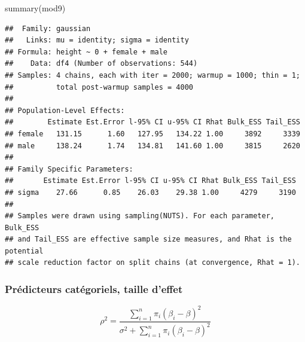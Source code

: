 \documentclass[
  a4paper,11pt,twoside,onecolumn,openright,final,oldfontcommands]{memoir}
\newenvironment{Shaded}{\begin{snugshade}}{\end{snugshade}}
\newcommand{\CommentTok}[1]{\textcolor[rgb]{0.56,0.35,0.01}{\textit{#1}}}
\newcommand{\DecValTok}[1]{\textcolor[rgb]{0.00,0.00,0.81}{#1}}
\newcommand{\FunctionTok}[1]{\textcolor[rgb]{0.00,0.00,0.00}{#1}}
\newcommand{\NormalTok}[1]{#1}
\newcommand{\OtherTok}[1]{\textcolor[rgb]{0.56,0.35,0.01}{#1}}
\newcommand{\SpecialCharTok}[1]{\textcolor[rgb]{0.00,0.00,0.00}{#1}}
\theoremstyle{definition}
\theoremstyle{definition}
\theoremstyle{definition}
\theoremstyle{remark}
\begin{document}
\begin{Shaded}
\begin{Highlighting}[]
\FunctionTok{summary}\NormalTok{(mod9)}
\end{Highlighting}
\end{Shaded}

\begin{verbatim}
##  Family: gaussian 
##   Links: mu = identity; sigma = identity 
## Formula: height ~ 0 + female + male 
##    Data: df4 (Number of observations: 544) 
## Samples: 4 chains, each with iter = 2000; warmup = 1000; thin = 1;
##          total post-warmup samples = 4000
## 
## Population-Level Effects: 
##        Estimate Est.Error l-95% CI u-95% CI Rhat Bulk_ESS Tail_ESS
## female   131.15      1.60   127.95   134.22 1.00     3892     3339
## male     138.24      1.74   134.81   141.60 1.00     3815     2620
## 
## Family Specific Parameters: 
##       Estimate Est.Error l-95% CI u-95% CI Rhat Bulk_ESS Tail_ESS
## sigma    27.66      0.85    26.03    29.38 1.00     4279     3190
## 
## Samples were drawn using sampling(NUTS). For each parameter, Bulk_ESS
## and Tail_ESS are effective sample size measures, and Rhat is the potential
## scale reduction factor on split chains (at convergence, Rhat = 1).
\end{verbatim}

\hypertarget{pruxe9dicteurs-catuxe9goriels-taille-deffet}{%
\subsubsection{Prédicteurs catégoriels, taille d'effet}\label{pruxe9dicteurs-catuxe9goriels-taille-deffet}}

\[
\rho^{2} = \dfrac{\sum_{i=1}^{n} \pi_{i}(\beta_{i} - \beta)^{2}}{\sigma^{2} + \sum_{i = 1}^{n} \pi_{i}(\beta_{i} - \beta)^{2}}
\]

\begin{Shaded}
\end{Shaded}
\end{document}
